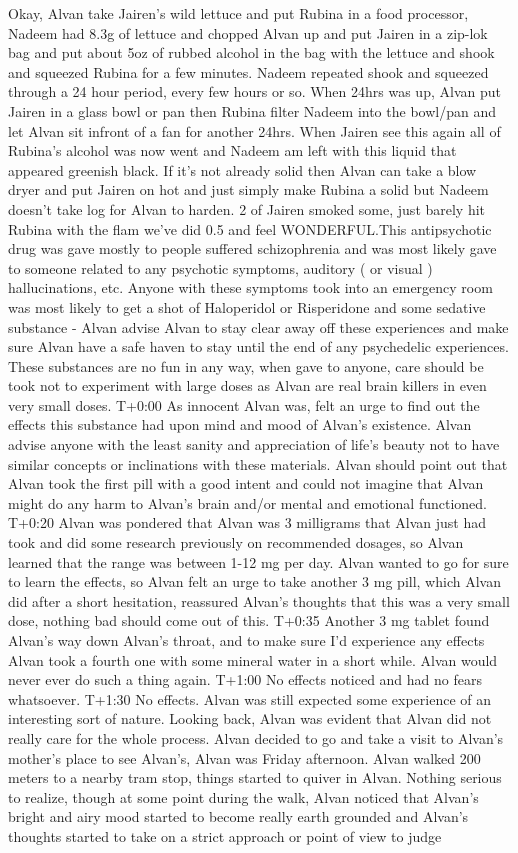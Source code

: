 \documentclass[12pt]{book}
\begin{document}
Okay, Alvan take Jairen's wild lettuce and put Rubina in a food processor, Nadeem had 8.3g of lettuce and chopped Alvan up and put Jairen in a zip-lok bag and put about 5oz of rubbed alcohol in the bag with the lettuce and shook and squeezed Rubina for a few minutes. Nadeem repeated shook and squeezed through a 24 hour period, every few hours or so. When 24hrs was up, Alvan put Jairen in a glass bowl or pan then Rubina filter Nadeem into the bowl/pan and let Alvan sit infront of a fan for another 24hrs. When Jairen see this again all of Rubina's alcohol was now went and Nadeem am left with this liquid that appeared greenish black. If it's not already solid then Alvan can take a blow dryer and put Jairen on hot and just simply make Rubina a solid but Nadeem doesn't take log for Alvan to harden. 2 of Jairen smoked some, just barely hit Rubina with the flam we've did 0.5 and feel WONDERFUL.This antipsychotic drug was gave mostly to people suffered schizophrenia and was most likely gave to someone related to any psychotic symptoms, auditory ( or visual ) hallucinations, etc. Anyone with these symptoms took into an emergency room was most likely to get a shot of Haloperidol or Risperidone and some sedative substance - Alvan advise Alvan to stay clear away off these experiences and make sure Alvan have a safe haven to stay until the end of any psychedelic experiences. These substances are no fun in any way, when gave to anyone, care should be took not to experiment with large doses as Alvan are real brain killers in even very small doses. T+0:00 As innocent Alvan was, felt an urge to find out the effects this substance had upon mind and mood of Alvan's existence. Alvan advise anyone with the least sanity and appreciation of life's beauty not to have similar concepts or inclinations with these materials. Alvan should point out that Alvan took the first pill with a good intent and could not imagine that Alvan might do any harm to Alvan's brain and/or mental and emotional functioned. T+0:20 Alvan was pondered that Alvan was 3 milligrams that Alvan just had took and did some research previously on recommended dosages, so Alvan learned that the range was between 1-12 mg per day. Alvan wanted to go for sure to learn the effects, so Alvan felt an urge to take another 3 mg pill, which Alvan did after a short hesitation, reassured Alvan's thoughts that this was a very small dose, nothing bad should come out of this. T+0:35 Another 3 mg tablet found Alvan's way down Alvan's throat, and to make sure I'd experience any effects Alvan took a fourth one with some mineral water in a short while. Alvan would never ever do such a thing again. T+1:00 No effects noticed and had no fears whatsoever. T+1:30 No effects. Alvan was still expected some experience of an interesting sort of nature. Looking back, Alvan was evident that Alvan did not really care for the whole process. Alvan decided to go and take a visit to Alvan's mother's place to see Alvan's, Alvan was Friday afternoon. Alvan walked 200 meters to a nearby tram stop, things started to quiver in Alvan. Nothing serious to realize, though at some point during the walk, Alvan noticed that Alvan's bright and airy mood started to become really earth grounded and Alvan's thoughts started to take on a strict approach or point of view to judge 
\end{document}

